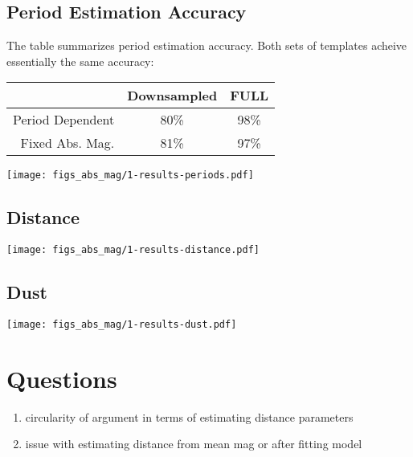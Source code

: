 \documentclass[12pt]{article}
\begin{document}
\subsection{Period Estimation Accuracy}
The table summarizes period estimation accuracy. Both sets of templates acheive essentially the same accuracy:

\begin{center}
\begin{tabular}{ r | c | c }
& Downsampled & FULL \\
  \hline
  Period Dependent & 80\% & 98\%\\ 
  Fixed Abs. Mag. & 81\% & 97\%\\ 
  \hline 
\end{tabular}
\end{center}


\begin{center}
  \texttt{[image: figs\_abs\_mag/1-results-periods.pdf]}
\end{center}



\subsection{Distance}


\begin{center}
  \texttt{[image: figs\_abs\_mag/1-results-distance.pdf]}
\end{center}


\subsection{Dust}

\begin{center}
  \texttt{[image: figs\_abs\_mag/1-results-dust.pdf]}
\end{center}









\section{Questions}
\label{sec:questions}

\begin{enumerate}
\item circularity of argument in terms of estimating distance parameters
\item issue with estimating distance from mean mag or after fitting model
\end{enumerate}



%
%
\end{document}
